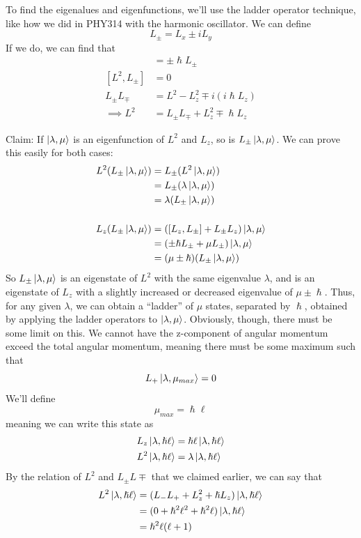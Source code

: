 \documentclass[a4paper]{article}
\begin{document}
To find the eigenalues and eigenfunctions, we'll use the ladder operator
technique, like how we did in PHY314 with the harmonic oscillator.
We can define
\[ L_{\pm} = L_x \pm iL_y \]
If we do, we can find that
\begin{align*}
	[L_z,L_{\pm}] &= \pm\hslash L_{\pm}\\
	[L^2,L_{\pm}] &= 0\\
	L_\pm L_\mp &= L^2-L_z^2\mp i(i\hslash L_z)\\
	\implies L^2 &= L_\pm L_\mp + L_z^2 \mp \hslash L_z
\end{align*}

Claim: If $\left\lvert \lambda,\mu\right\rangle$ is an eigenfunction of $L^2$ and $L_z$, so is
$L_{\pm}\left\lvert \lambda,\mu\right\rangle$. We can prove this easily for both cases:
\begin{align*}
L^2(L_\pm\left\lvert \lambda,\mu\right\rangle) &= L_\pm(L^2\left\lvert \lambda,\mu\right\rangle)\\
			     &= L_\pm (\lambda\left\lvert \lambda,\mu\right\rangle)\\
			     &= \lambda(L_\pm\left\lvert \lambda,\mu\right\rangle)\\~\\
L_z(L_{\pm}\left\lvert \lambda,\mu\right\rangle)&=([L_z,L_\pm]+L_\pm L_z)\left\lvert \lambda,\mu\right\rangle\\
			      &=(\pm\hslash L_\pm+\mu L_\pm)\left\lvert \lambda,\mu\right\rangle\\
			      &= (\mu\pm\hslash)(L_\pm\left\lvert \lambda,\mu\right\rangle)
\end{align*}
So $L_\pm\left\lvert \lambda,\mu\right\rangle$ is an eigenstate of $L^2$ with the same
eigenvalue $\lambda$, and is an eigenstate of $L_z$ with a slightly increased
or decreased eigenvalue of $\mu \pm \hslash$. Thus, for any given $\lambda$,
we can obtain a ``ladder'' of $\mu$ states, separated by $\hslash$,
obtained by applying the ladder operators to $\left\lvert \lambda,\mu\right\rangle$. Obviously,
though, there must be some limit on this. We cannot have the z-component of
angular momentum exceed the total angular momentum, meaning there must be
some maximum such that
\[ L_+\left\lvert \lambda,\mu_{max}\right\rangle = 0 \]
We'll define \[\mu_{max} = \hslash\ell\] meaning we can write this state as
\begin{align*}
	L_z\left\lvert \lambda,\hslash\ell\right\rangle&=\hslash\ell\left\lvert \lambda,\hslash\ell\right\rangle\\
	L^2\left\lvert \lambda,\hslash\ell\right\rangle&=\lambda\left\lvert \lambda,\hslash\ell\right\rangle
\end{align*}
By the relation of $L^2$ and $L_\pm L\mp$ that we claimed earlier, we can say
that
\begin{align*}
	L^2\left\lvert \lambda,\hslash\ell\right\rangle&=
		(L_-L_+ + L_z^2+\hslash L_z)\left\lvert \lambda,\hslash\ell\right\rangle\\
		&=(0+\hslash^2\ell^2+\hslash^2\ell)\left\lvert \lambda,\hslash\ell\right\rangle\\
		&= \hslash^2\ell(\ell+1)
\end{align*}
\end{document}
